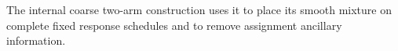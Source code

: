 The internal coarse two-arm construction uses it to place its smooth mixture on complete fixed response schedules and to remove assignment ancillary information.